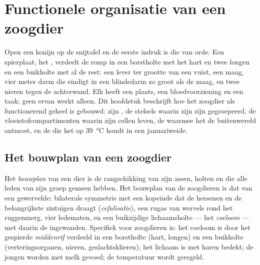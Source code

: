\chapter{Functionele organisatie van een zoogdier}\label{ch:b1:mammal-organization}

Open een konijn op de snijtafel en de eerste indruk is die van orde. Een
spierplaat, het , verdeelt de romp in een borstholte met het hart en
twee longen en een buikholte met al de rest: een lever ter grootte van een
vuist, een maag, vier meter darm die eindigt in een blindedarm zo groot als de
maag, en twee nieren tegen de achterwand. Elk  heeft een plaats, een
bloedvoorziening en een taak; geen ervan werkt alleen. Dit hoofdstuk beschrijft
hoe het zoogdier als functionerend geheel is gebouwd: zijn , de
stelsels waarin zijn  zijn gegroepeerd, de vloeistofcompartimenten
waarin zijn cellen leven, de  waarmee het de
buitenwereld ontmoet, en de  die het op \qty{39}{\celsius} houdt in
een januariweide.

\section{Het bouwplan van een zoogdier}

\begin{definition}[Bouwplan]\label{def:b1:mammal-organization:bodyplan}
Het \emph{bouwplan} van een dier is de rangschikking van zijn
assen, holten en  die alle leden van zijn groep gemeen hebben. Het
bouwplan van de zoogdieren is dat van een gewervelde: bilaterale symmetrie met
een kopeinde dat de hersenen en de belangrijkste zintuigen draagt
(\emph{cefalisatie}), een rugas van wervels rond het
ruggenmerg, vier ledematen, en een buikzijdige lichaamsholte --- het
\emph{coeloom} --- met daarin de ingewanden. Specifiek voor
zoogdieren is: het coeloom is door het gespierde
\emph{middenrif} verdeeld in een borstholte (hart, longen) en
een buikholte (verteringsorganen, nieren, geslachtsklieren); het lichaam is met
haren bedekt; de jongen worden met melk gevoed; de temperatuur wordt geregeld.
\end{definition}


